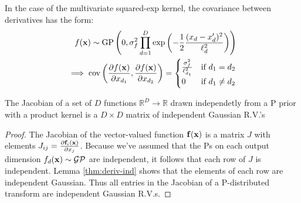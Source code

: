 \documentclass[twoside]{article}
\makeatletter
\newcommand{\Jx}{J_{\vx \rightarrow \vy}}
\newlength{\nonHumbleHeight}
\def\@humbleformat#1{{\settoheight{\nonHumbleHeight}{#1}\resizebox{!}{0.94\nonHumbleHeight}{#1}}}%
\def\humble#1{\@humbleformat{#1}}%
\newcommand{\gp}{{\humble GP}}
\makeatother
\begin{document}
In the case of the multivariate squared-exp kernel, the covariance between derivatives has the form:
%
\begin{align}
f({\bf{x}}) \sim \textnormal{GP}\left( 0, 
\sigma^2_f \prod_{d=1}^D \exp \left(-\frac{1}{2} \frac{(x_d - x_d')^2}{\ell_d^2} \right) \right) \nonumber \\
 \implies 
\operatorname{cov} \left( \frac{\partial f({\bf{x}})}{\partial x_{d_1}}, \frac{\partial f({\bf{x}})}{\partial x_{d_2}} \right) =
\begin{cases} 
\frac{\sigma^2_f}{\ell_{d_1}^2} & \mbox{if } d_1 = d_2 \\ 
0 & \mbox{if } d_1 \neq d_2 \end{cases}
\end{align}


\begin{lemma}
\label{thm:matrix}
The Jacobian of a set of $D$ functions $\mathbb{R}^D \rightarrow \mathbb{R}$ drawn independetly from a \gp{} prior with a product kernel is a $D \times D$ matrix of independent Gaussian R.V.'s
\end{lemma}
%
\begin{proof}
The Jacobian of the vector-valued function ${\bf{f}}({\bf{x}})$ is a matrix $J$ with elements ${J_{ij} = \frac{ \partial {\bf{f}}_i ({\bf{x}}) }{\partial x_j}}$.
%
%
%
Because we've assumed that the \gp{}s on each output dimension $f_d({\bf{x}}) \sim \mathcal{GP}$ are independent, it follows that each row of $J$ is independent.
Lemma \ref{thm:deriv-ind} shows that the elements of each row are independent Gaussian.
Thus all entries in the Jacobian of a \gp{}-distributed transform are independent Gaussian R.V.s.
\end{proof}
\end{document}
